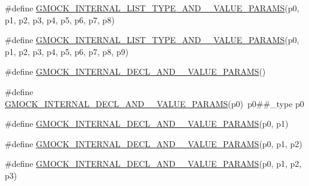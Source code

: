 \begin{DoxyCompactItemize}
\item 
\#define \mbox{\hyperlink{_obj__test_2lib_2googletest-release-1_88_81_2googlemock_2include_2gmock_2gmock-generated-actions_8h_a3f7dd2bdf5feb78d9cd6a538366fed46}{G\+M\+O\+C\+K\+\_\+\+I\+N\+T\+E\+R\+N\+A\+L\+\_\+\+L\+I\+S\+T\+\_\+\+T\+Y\+P\+E\+\_\+\+A\+N\+D\+\_\+\_\+\+V\+A\+L\+U\+E\+\_\+\+P\+A\+R\+A\+MS}}(p0,  p1,  p2,  p3,  p4,  p5,  p6,  p7,  p8)
\item 
\#define \mbox{\hyperlink{_obj__test_2lib_2googletest-release-1_88_81_2googlemock_2include_2gmock_2gmock-generated-actions_8h_a646b96a3f316fa629cf7faaf509de76e}{G\+M\+O\+C\+K\+\_\+\+I\+N\+T\+E\+R\+N\+A\+L\+\_\+\+L\+I\+S\+T\+\_\+\+T\+Y\+P\+E\+\_\+\+A\+N\+D\+\_\+\_\+\+V\+A\+L\+U\+E\+\_\+\+P\+A\+R\+A\+MS}}(p0,  p1,  p2,  p3,  p4,  p5,  p6,  p7,  p8,  p9)
\item 
\#define \mbox{\hyperlink{_obj__test_2lib_2googletest-release-1_88_81_2googlemock_2include_2gmock_2gmock-generated-actions_8h_afbcc498768661d32cb658a8eb28535a9}{G\+M\+O\+C\+K\+\_\+\+I\+N\+T\+E\+R\+N\+A\+L\+\_\+\+D\+E\+C\+L\+\_\+\+A\+N\+D\+\_\+\_\+\+V\+A\+L\+U\+E\+\_\+\+P\+A\+R\+A\+MS}}()
\item 
\#define \mbox{\hyperlink{_obj__test_2lib_2googletest-release-1_88_81_2googlemock_2include_2gmock_2gmock-generated-actions_8h_a4440fd8222dde30e41f05209f06a2d00}{G\+M\+O\+C\+K\+\_\+\+I\+N\+T\+E\+R\+N\+A\+L\+\_\+\+D\+E\+C\+L\+\_\+\+A\+N\+D\+\_\+\_\+\+V\+A\+L\+U\+E\+\_\+\+P\+A\+R\+A\+MS}}(p0)~p0\#\#\+\_\+type p0
\item 
\#define \mbox{\hyperlink{_obj__test_2lib_2googletest-release-1_88_81_2googlemock_2include_2gmock_2gmock-generated-actions_8h_ab11df3777b85b01132aa4057017b22ca}{G\+M\+O\+C\+K\+\_\+\+I\+N\+T\+E\+R\+N\+A\+L\+\_\+\+D\+E\+C\+L\+\_\+\+A\+N\+D\+\_\+\_\+\+V\+A\+L\+U\+E\+\_\+\+P\+A\+R\+A\+MS}}(p0,  p1)
\item 
\#define \mbox{\hyperlink{_obj__test_2lib_2googletest-release-1_88_81_2googlemock_2include_2gmock_2gmock-generated-actions_8h_a81147c9dca4694a07acccd9324990585}{G\+M\+O\+C\+K\+\_\+\+I\+N\+T\+E\+R\+N\+A\+L\+\_\+\+D\+E\+C\+L\+\_\+\+A\+N\+D\+\_\+\_\+\+V\+A\+L\+U\+E\+\_\+\+P\+A\+R\+A\+MS}}(p0,  p1,  p2)
\item 
\#define \mbox{\hyperlink{_obj__test_2lib_2googletest-release-1_88_81_2googlemock_2include_2gmock_2gmock-generated-actions_8h_a0580c33b8405f1820a382f9b9471f157}{G\+M\+O\+C\+K\+\_\+\+I\+N\+T\+E\+R\+N\+A\+L\+\_\+\+D\+E\+C\+L\+\_\+\+A\+N\+D\+\_\+\_\+\+V\+A\+L\+U\+E\+\_\+\+P\+A\+R\+A\+MS}}(p0,  p1,  p2,  p3)
\item 

\end{DoxyCompactItemize}
